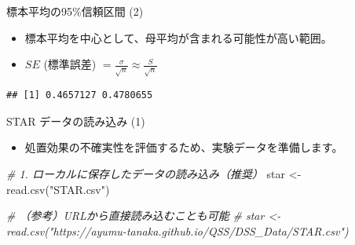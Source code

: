 \documentclass[
  ignorenonframetext,
]{beamer}
\newenvironment{Shaded}{\begin{snugshade}}{\end{snugshade}}
\newcommand{\CommentTok}[1]{\textcolor[rgb]{0.56,0.35,0.01}{\textit{#1}}}
\newcommand{\FloatTok}[1]{\textcolor[rgb]{0.00,0.00,0.81}{#1}}
\newcommand{\FunctionTok}[1]{\textcolor[rgb]{0.00,0.00,0.00}{#1}}
\newcommand{\NormalTok}[1]{#1}
\newcommand{\OtherTok}[1]{\textcolor[rgb]{0.56,0.35,0.01}{#1}}
\newcommand{\SpecialCharTok}[1]{\textcolor[rgb]{0.00,0.00,0.00}{#1}}
\newcommand{\StringTok}[1]{\textcolor[rgb]{0.31,0.60,0.02}{#1}}
\providecommand{\tightlist}{%
  \setlength{\itemsep}{0pt}\setlength{\parskip}{0pt}}
\begin{document}
\begin{frame}[fragile]{標本平均の95\%信頼区間 (2)}
\protect\hypertarget{ux6a19ux672cux5e73ux5747ux306e95ux4fe1ux983cux533aux9593-2}{}
\begin{itemize}
\tightlist
\item
  標本平均を中心として、母平均が含まれる可能性が高い範囲。
\item
  \(SE\) (標準誤差)
  \(= \frac{\sigma}{\sqrt{n}} \approx \frac{S}{\sqrt{n}}\)
\end{itemize}

\scriptsize

\begin{Shaded}
\end{Shaded}

\begin{verbatim}
## [1] 0.4657127 0.4780655
\end{verbatim}

\normalsize
\end{frame}

\begin{frame}[fragile]{STAR データの読み込み (1)}
\protect\hypertarget{star-ux30c7ux30fcux30bfux306eux8aadux307fux8fbcux307f-1}{}
\begin{itemize}
\tightlist
\item
  処置効果の不確実性を評価するため、実験データを準備します。
\end{itemize}

\scriptsize

\begin{Shaded}
\begin{Highlighting}[]
\CommentTok{\# 1. ローカルに保存したデータの読み込み（推奨）}
\NormalTok{star }\OtherTok{\textless{}{-}} \FunctionTok{read.csv}\NormalTok{(}\StringTok{"STAR.csv"}\NormalTok{)}

\CommentTok{\# （参考）URLから直接読み込むことも可能}
\CommentTok{\# star \textless{}{-} read.csv("https://ayumu{-}tanaka.github.io/QSS/DSS\_Data/STAR.csv")}
\end{Highlighting}
\end{Shaded}

\normalsize
\end{frame}
\end{document}
